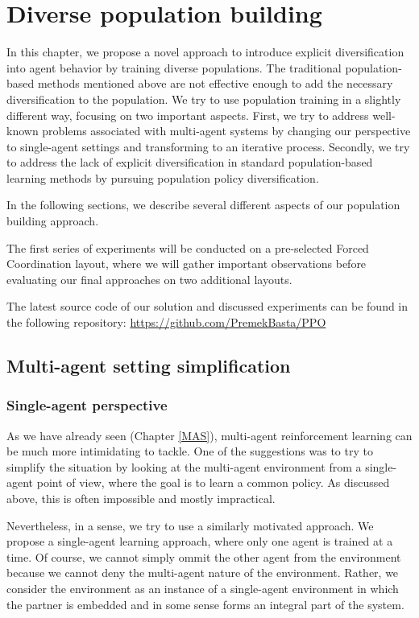 \chapter{Diverse population building}\label{DiversePopulationMethodChapter}
In this chapter, we propose a novel approach to introduce explicit diversification into agent behavior by training diverse populations.
The traditional population-based methods mentioned above are not effective enough to add the necessary diversification to the population.
We try to use population training in a slightly different way, focusing on two important aspects.
First, we try to address well-known problems associated with multi-agent systems by changing our perspective to single-agent settings and transforming to an iterative process.
Secondly, we try to address the lack of explicit diversification in standard population-based learning methods by pursuing population policy diversification.

In the following sections, we describe several different aspects of our population building approach.

The first series of experiments will be conducted on a pre-selected Forced Coordination layout, where we will gather important observations before evaluating our final approaches on two additional layouts.

The latest source code of our solution and discussed experiments can be found in the following repository:
\url{https://github.com/PremekBasta/PPO}


\section{Multi-agent setting simplification}

\subsection{Single-agent perspective}
As we have already seen (Chapter \ref{MAS}), multi-agent reinforcement learning can be much more intimidating to tackle.
One of the suggestions was to try to simplify the situation by looking at the multi-agent environment from a single-agent point of view, where the goal is to learn a common policy.
As discussed above, this is often impossible and mostly impractical.

Nevertheless, in a sense, we try to use a similarly motivated approach.
We propose a single-agent learning approach, where only one agent is trained at a time.
Of course, we cannot simply ommit the other agent from the environment because we cannot deny the multi-agent nature of the environment.
Rather, we consider the environment as an instance of a single-agent environment in which the partner is embedded and in some sense forms an integral part of the system.

